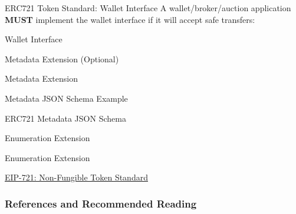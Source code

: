 \documentclass[]{beamer}
\begin{document}
\begin{frame}{ERC721 Token Standard: Wallet Interface}
A wallet/broker/auction application \textbf{MUST} implement the wallet interface if it will accept safe transfers:
\begin{samplecode}{Wallet Interface}
		
\end{samplecode}
\end{frame}

\begin{frame}{Metadata Extension (Optional)}
\begin{samplecode}{Metadata Extension}
		
\end{samplecode}

\vspace{0.5em}

\end{frame}

\begin{frame}{Metadata JSON Schema Example}
\begin{samplecode}{ERC721 Metadata JSON Schema}
		
\end{samplecode}
\end{frame}

\begin{frame}{Enumeration Extension}
\begin{samplecode}{Enumeration Extension}
		
\end{samplecode}

\vspace{1 em}
\link \href{https://eips.ethereum.org/EIPS/eip-721}{EIP-721: Non-Fungible Token Standard}
\end{frame}

\begin{frame}%
\frametitle{References and Recommended Reading}
	
	
\end{frame}
\end{document}
